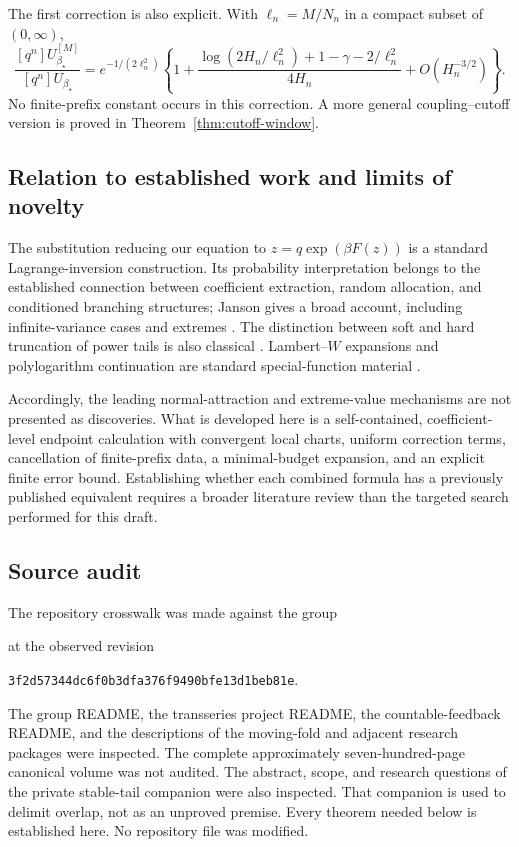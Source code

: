 \documentclass[11pt,a4paper]{article}
\numberwithin{equation}{section}
\theoremstyle{definition}
\theoremstyle{remark}
\newcommand{\bs}{\beta_\star}
\begin{document}
The first correction is also explicit. With \(\ell_n=M/N_n\) in a compact
subset of \((0,\infty)\),
\begin{equation}
\frac{[q^n]U_{\bs}^{[M]}}{[q^n]U_{\bs}}
=e^{-1/(2\ell_n^2)}
\left\{1+
\frac{\log(2H_n/\ell_n^2)+1-\gamma-2/\ell_n^2}{4H_n}
+O(H_n^{-3/2})\right\}.
\label{eq:intro-correction}
\end{equation}
No finite-prefix constant occurs in this correction. A more general
coupling--cutoff version is proved in Theorem~\ref{thm:cutoff-window}.

\subsection{Relation to established work and limits of novelty}
The substitution reducing our equation to \(z=q\exp(\beta F(z))\) is a standard
Lagrange-inversion construction. Its probability interpretation belongs to
the established connection between coefficient extraction, random allocation,
and conditioned branching structures; Janson gives a broad account, including
infinite-variance cases and extremes \cite{janson}. The distinction between
soft and hard truncation of power tails is also classical
\cite{chakrabarty-samorodnitsky}. Lambert--\(W\) expansions and polylogarithm
continuation are standard special-function material \cite{dlmf-polylog,dlmf-w}.

Accordingly, the leading normal-attraction and extreme-value mechanisms are
not presented as discoveries. What is developed here is a self-contained,
coefficient-level endpoint calculation with convergent local charts,
uniform correction terms, cancellation of finite-prefix data, a minimal-budget
expansion, and an explicit finite error bound. Establishing whether each
combined formula has a previously published equivalent requires a broader
literature review than the targeted search performed for this draft.

\subsection{Source audit}
The repository crosswalk was made against the group
\begin{center}\small
{}
\end{center}
at the observed revision
\begin{center}\small
\texttt{3f2d57344dc6f0b3dfa376f9490bfe13d1beb81e}.
\end{center}
The group README, the transseries project README, the countable-feedback
README, and the descriptions of the moving-fold and adjacent research
packages were inspected. The complete approximately seven-hundred-page
canonical volume was not audited. The abstract, scope, and research questions
of the private stable-tail companion were also inspected. That companion is
used to delimit overlap, not as an unproved premise. Every theorem needed
below is established here. No repository file was modified.
\end{document}
